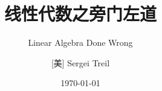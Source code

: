 \documentclass[twoside,openright,zihao=-4]{zhbook}
\title{线性代数之旁门左道}  %
\subtitle{Linear Algebra Done Wrong}  %
\author{[美] Sergei Treil}  %
\date{\today}  %
\begin{document}
\maketitle

%



\frontmatter




% 


\maketoc




% 



\mainmatter
























% 
\end{document}
